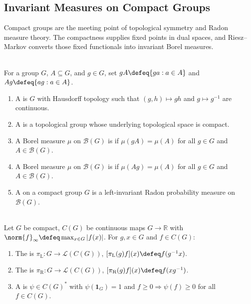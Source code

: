\subsection{Invariant Measures on Compact Groups} \label{subsec:invariant-measures-on-compact-groups}

Compact groups are the meeting point of topological symmetry and Radon measure theory. The compactness supplies fixed points in dual spaces, and Riesz--Markov converts those fixed functionals into invariant Borel measures.

\begin{definition} \label{def:compact-topological-groups-and-haar-measures} \\
For a group $G$, $A\subseteq G$, and $g\in G$, set $gA\defeq\{ga:a\in A\}$ and $Ag\defeq\{ag:a\in A\}$.
\begin{enumerate}[label=(\roman*)]
\setlength{\itemsep}{0pt}
\item A  is $G$ with Hausdorff topology such that $(g,h)\mapsto gh$ and $g\mapsto g^{-1}$ are continuous.
\item A  is a topological group whose underlying topological space is compact.
\item A Borel measure $\mu$ on $\mathcal{B}(G)$ is  if $\mu(gA)=\mu(A)$ for all $g\in G$ and $A\in\mathcal{B}(G)$.
\item A Borel measure $\mu$ on $\mathcal{B}(G)$ is  if $\mu(Ag)=\mu(A)$ for all $g\in G$ and $A\in\mathcal{B}(G)$.
\item A  on a compact group $G$ is a left-invariant Radon probability measure on $\mathcal{B}(G)$.
\end{enumerate}
\end{definition}

\begin{definition} \label{def:regular-representation-compact-group} \\
Let $G$ be compact, $C(G)$ be continuous maps $G\to\mathbb{R}$ with $\norm{f}_\infty\defeq\max_{x\in G}|f(x)|$. For $g,x\in G$ and $f\in C(G)$:
\begin{enumerate}[label=(\roman*)]
\setlength{\itemsep}{0pt}
\item The  is $\pi_{\mathrm{L}}:G\to\mathcal{L}(C(G))$, $[\pi_{\mathrm{L}}(g)f](x)\defeq f(g^{-1}x)$.
\item The  is $\pi_{\mathrm{R}}:G\to\mathcal{L}(C(G))$, $[\pi_{\mathrm{R}}(g)f](x)\defeq f(xg^{-1})$.
\item A  is $\psi\in C(G)^*$ with $\psi(\mathbf{1}_G)=1$ and $f\geq0\Rightarrow\psi(f)\geq0$ for all $f\in C(G)$.
\end{enumerate}
\end{definition}

